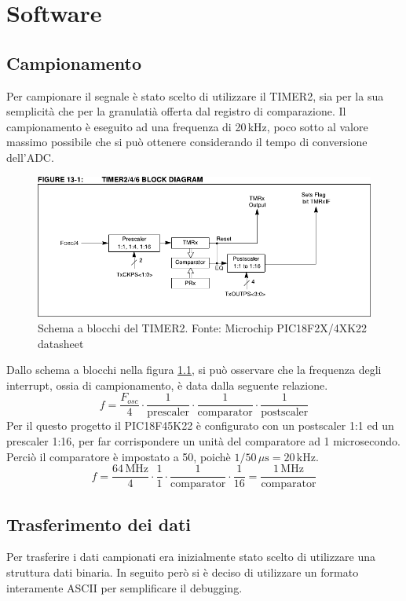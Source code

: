 \chapter{Software}
\section{Campionamento}
Per campionare il segnale \`e stato scelto di utilizzare il TIMER2, sia per la
sua semplicit\`a che per la granulati\`a offerta dal registro di comparazione.
Il campionamento \`e eseguito ad una frequenza di 20\,kHz, poco sotto al
valore massimo possibile che si pu\`o ottenere considerando il tempo di
conversione dell'ADC.

\begin{figure}[H] \centering
    \includegraphics[width=.9\linewidth]{figures/timer2-block-diagram}
    \caption[Schema a blocchi del TIMER2]{
        Schema a blocchi del TIMER2. Fonte: Microchip PIC18F2X/4XK22 datasheet
        \label{fig:timer2-diagram}
    }
\end{figure}

Dallo schema a blocchi nella figura \ref{fig:timer2-diagram}, si pu\`o
osservare che la frequenza degli interrupt, ossia di campionamento, \`e data
dalla seguente relazione.
\[
    f = \frac{F_{osc}}{4}\cdot
        \frac{1}{\textrm{prescaler}}\cdot
        \frac{1}{\textrm{comparator}}\cdot
        \frac{1}{\textrm{postscaler}}
\]
Per il questo progetto il PIC18F45K22 \`e configurato con un postscaler 1:1 ed
un prescaler 1:16, per far corrispondere un unit\`a del comparatore ad 1
microsecondo. Perci\`o il comparatore \`e impostato a 50, poich\`e
\(1/50\,\mu\textrm{s} = 20\,\textrm{kHz}\).
\[ 
    f = \frac{64\,\textrm{MHz}}{4}\cdot
        \frac{1}{1}\cdot
        \frac{1}{\textrm{comparator}}\cdot
        \frac{1}{16}
      = \frac{1\,\textrm{MHz}}{\textrm{comparator}}
\]

\section{Trasferimento dei dati}
Per trasferire i dati campionati era inizialmente stato scelto di utilizzare
una struttura dati binaria. In seguito per\`o si \`e deciso di utilizzare un
formato interamente ASCII per semplificare il debugging.

